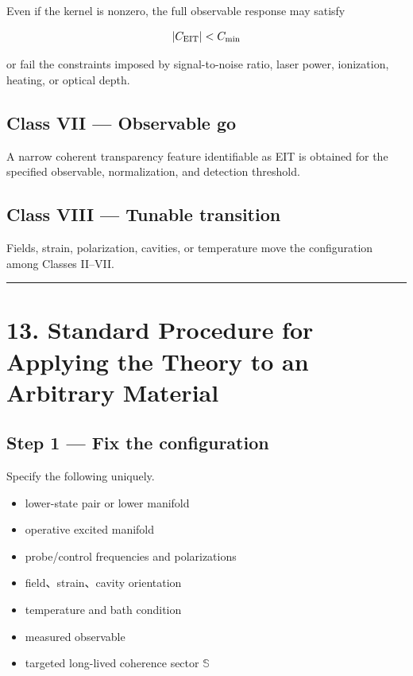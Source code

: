 \documentclass[
  10pt,
  a4paper,
]{article}
\providecommand{\tightlist}{%
  \setlength{\itemsep}{0pt}\setlength{\parskip}{0pt}}
\begin{document}
Even if the kernel is nonzero, the full observable response may satisfy

\[
|C_{\rm EIT}|<C_{\rm min}
\]

or fail the constraints imposed by signal-to-noise ratio, laser power,
ionization, heating, or optical depth.

\subsection{Class VII --- Observable go}\label{class-vii-observable-go}

A narrow coherent transparency feature identifiable as EIT is obtained
for the specified observable, normalization, and detection threshold.

\subsection{Class VIII --- Tunable
transition}\label{class-viii-tunable-transition}

Fields, strain, polarization, cavities, or temperature move the
configuration among Classes II--VII.

\begin{center}\rule{0.5\linewidth}{0.5pt}\end{center}

\section{13. Standard Procedure for Applying the Theory to an Arbitrary
Material}\label{standard-procedure-for-applying-the-theory-to-an-arbitrary-material}

\subsection{Step 1 --- Fix the
configuration}\label{step-1-fix-the-configuration}

Specify the following uniquely.

\begin{itemize}
\tightlist
\item
  lower-state pair or lower manifold
\item
  operative excited manifold
\item
  probe/control frequencies and polarizations
\item
  field、strain、cavity orientation
\item
  temperature and bath condition
\item
  measured observable
\item
  targeted long-lived coherence sector \(\mathbb S\)
\end{itemize}
\end{document}
